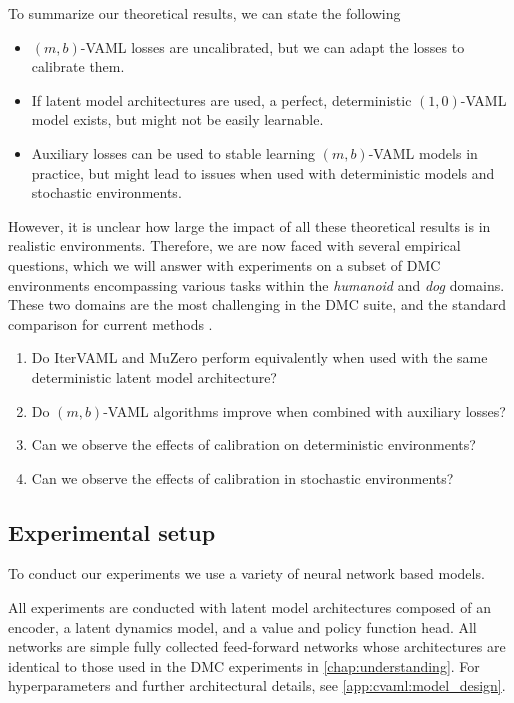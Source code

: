 To summarize our theoretical results, we can state the following
\begin{itemize}
    \item $(m,b)$-VAML losses are uncalibrated, but we can adapt the losses to calibrate them.
    \item If latent model architectures are used, a perfect, deterministic $(1,0)$-VAML model exists, but might not be easily learnable.
    \item Auxiliary losses can be used to stable learning $(m,b)$-VAML models in practice, but might lead to issues when used with deterministic models and stochastic environments.
\end{itemize}

However, it is unclear how large the impact of all these theoretical results is in realistic environments.
Therefore, we are now faced with several empirical questions, which we will answer with experiments on a subset of DMC environments \parencite{tunyasuvunakool2020dmcontrol} encompassing various tasks within the \textit{humanoid} and \textit{dog} domains.
These two domains are the most challenging in the DMC suite, and the standard comparison for current methods \parencite{voelcker2025mad,nauman2024bigger}.

\begin{enumerate}
    \item Do IterVAML and MuZero perform equivalently when used with the same deterministic latent model architecture?
    \item Do $(m,b)$-VAML algorithms improve when combined with auxiliary losses?
    \item Can we observe the effects of calibration on deterministic environments?
    \item Can we observe the effects of calibration in stochastic environments?
\end{enumerate}

\subsection{Experimental setup}

To conduct our experiments we use a variety of neural network based models.

All experiments are conducted with latent model architectures composed of an encoder, a latent dynamics model, and a value and policy function head.
All networks are simple fully collected feed-forward networks whose architectures are identical to those used in the DMC experiments in \autoref{chap:understanding}.
For hyperparameters and further architectural details, see \autoref{app:cvaml:model_design}.

